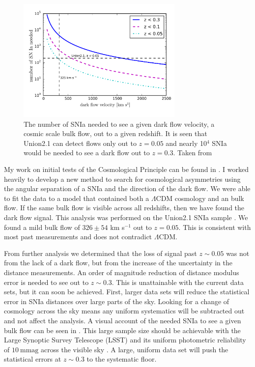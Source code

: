 \documentclass[apj, iop]{emulateapj}
\newcommand{\sn}{SNIa}
\newcommand{\lcdm}{$\Lambda$CDM}     %
\begin{document}
\begin{figure}
	\includegraphics[width=3.2in]{what_dataset_size_v_velocity.pdf} 
    \caption{The number of \sn{} needed to see a given dark flow velocity, a
	cosmic scale bulk flow, out to a given redshift. It is seen that Union2.1 
	can detect flows only out to $z=0.05$ and nearly 10$^4$ \sn{} would be 
	needed to see a dark flow out to $z=0.3$. Taken from \cite{Mathews16}}
	\label{f:sn-needed} 
\end{figure}

My work on initial tests of the Cosmological Principle can be found in
\cite{Mathews16}. I worked heavily to develop a new method to search for
cosmological asymmetries using the angular separation of a \sn{} and the
direction of the dark flow. We were able to fit the data to a model that
contained both a \lcdm{} cosmology and an bulk flow. If the same bulk flow is
visible across all redshifts, then we have found the dark flow signal. This
analysis was performed on the Union2.1 \sn{} sample \citep{Suzuki12}. We found a
mild bulk flow of $326 \pm 54$ km s$^{-1}$ out to $z = 0.05$. This is consistent
with most past measurements and does not contradict \lcdm{}.

From further analysis we determined that the loss of signal past $z \sim 0.05$
was not from the lack of a dark flow, but from the increase of the uncertainty
in the distance measurements. An order of magnitude reduction of distance
modulus error is needed to see out to $z \sim 0.3$.  This is unattainable with
the current data sets, but it can soon be achieved. First, larger data sets will
reduce the statistical error in \sn{} distances over large parts of the sky.
Looking for a change of cosmology across the sky means any uniform systematics
will be subtracted out and not affect the analysis.  A visual account of the
needed \sn{} to see a given bulk flow can be seen in  . This
large sample size should be achievable with the Large Synoptic Survey Telescope
(LSST) and its uniform photometric reliability of $10 ~\text{mmag}$ across the
visible sky \citep{Ivezic08}. A large, uniform data set will push the
statistical errors at $z\sim 0.3$ to the systematic floor.
\end{document}
